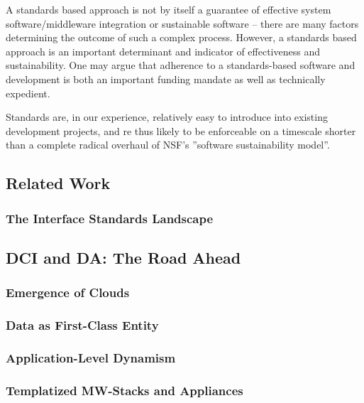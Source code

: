 \documentclass[a4paper,12pt]{article}
\begin{document}
A standards based approach is not by itself a guarantee of effective
system software/middleware integration or sustainable software --
there are many factors determining the outcome of such a complex
process. However, a standards based approach is an important
determinant and indicator of effectiveness and sustainability.  One
may argue that adherence to a standards-based software and development
is both an important funding mandate as well as technically expedient.  

Standards are, in our experience, relatively easy to introduce into
 existing development projects, and re thus likely to be enforceable
 on a timescale shorter than a complete radical overhaul of NSF’s
 ''software sustainability model''.

\subsection{Related Work}

\subsubsection{The Interface Standards Landscape}\label{interface_landscape}

\subsection{DCI and DA: The Road Ahead}

\subsubsection{Emergence of Clouds}

\subsubsection{Data as First-Class Entity}

\subsubsection{Application-Level Dynamism}

\subsubsection{Templatized MW-Stacks and Appliances}

 

\end{document}
